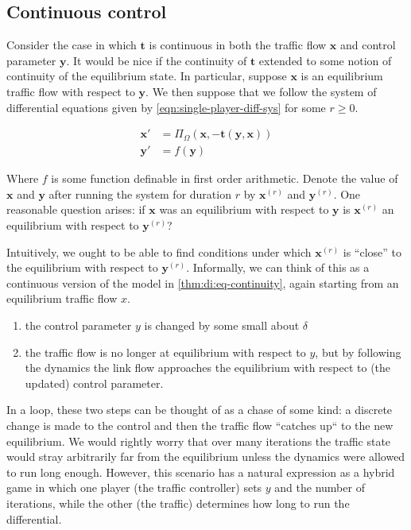 \subsection{Continuous control}

Consider the case in which $\mathbf{t}$ is continuous in both the traffic flow $\mathbf{x}$ and control parameter $\mathbf{y}$.
It would be nice if the continuity of $\mathbf{t}$ extended to some notion of continuity of the equilibrium state.
In particular, suppose $\mathbf{x}$ is an equilibrium traffic flow with respect to $\mathbf{y}$.
We then suppose that we follow the system of differential equations given by \eqref{eqn:single-player-diff-sys} for some $r\geq 0$.

\begin{subequations}
\begin{align}
    \mathbf{x}' &= \Pi_{\Omega} (\mathbf{x}, -\mathbf{t}(\mathbf{y}, \mathbf{x}))\\
    \mathbf{y}' &= f(\mathbf{y})
\end{align}
\label{eqn:single-player-diff-sys}
\end{subequations}

Where $f$ is some function definable in first order arithmetic.
Denote the value of $\mathbf{x}$ and $\mathbf{y}$ after running the system for duration $r$ by $\mathbf{x}^{(r)}$ and $\mathbf{y}^{(r)}$.
One reasonable question arises: if $\mathbf{x}$ was an equilibrium with respect to $\mathbf{y}$ is $\mathbf{x}^{(r)}$ an equilibrium with respect to $\mathbf{y}^{(r)}$?

Intuitively, we ought to be able to find conditions under which $\mathbf{x}^{(r)}$ is ``close'' to the equilibrium with respect to $\mathbf{y}^{(r)}$.
Informally, we can think of this as a continuous version of the model in \cref{thm:di:eq-continuity}, again starting from an equilibrium traffic flow $x$.
\begin{enumerate}
    \item the control parameter $y$ is changed by some small about $\delta$
    \item the traffic flow is no longer at equilibrium with respect to $y$, but by following the dynamics the link flow approaches the equilibrium with respect to (the updated) control parameter.
\end{enumerate}
In a loop, these two steps can be thought of as a chase of some kind: a discrete change is made to the control and then the traffic flow ``catches up`` to the new equilibrium.
We would rightly worry that over many iterations the traffic state would stray arbitrarily far from the equilibrium unless the dynamics were allowed to run long enough.
However, this scenario has a natural expression as a hybrid game in which one player (the traffic controller) sets $y$ and the number of iterations, while the other (the traffic) determines how long to run the differential.

